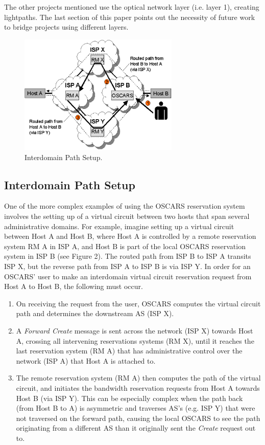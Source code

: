 \documentclass[conference]{IEEEtran}
\begin{document}
The other projects mentioned use the optical network layer (i.e. layer 1), 
creating lightpaths.  The last section of this paper points out the
necessity of future work to bridge projects using different layers.

\begin{figure}
 \centering 
   \includegraphics[width=3in]{pict2.eps}
   \caption{Interdomain Path Setup.}
 \label{fig:interdomain_path_setup}
\end{figure}

\subsection{Interdomain Path Setup }
One of the more complex examples of using the OSCARS reservation system
involves the setting up of a virtual circuit between two hosts that span
several administrative domains.  For example, imagine setting up a
virtual circuit between Host A and Host B, where Host A is controlled by a
remote reservation system RM A in ISP A, and Host B is part of the local
OSCARS reservation system in ISP B (see Figure 2). The routed path from ISP B
to ISP A transits ISP X, but the reverse path from ISP A to ISP B is via ISP Y.
In order for an OSCARS' user to make an interdomain virtual circuit reservation
request from Host A to Host B, the following must occur.
\begin{enumerate}
\item 
On receiving the request from the user, OSCARS
computes the virtual circuit path and determines the downstream AS (ISP X).
\item
A \emph{Forward Create} message is sent across the network (ISP X) towards Host
A, crossing all intervening reservations systems (RM X), until it reaches the
last reservation system (RM A) that has administrative control over the network
(ISP A) that Host A is attached to.
\item
The remote reservation system (RM A) then computes the path of the virtual
circuit, and initiates the bandwidth reservation requests from Host A towards
Host B (via ISP Y).  This can be especially complex when the path back (from
Host B to A) is asymmetric and traverses AS's (e.g. ISP Y) that were not
traversed on the forward path, causing the local OSCARS to see the path
originating from a different AS than it originally sent the \emph{Create} request
out to.

\end{enumerate}
\end{document}
